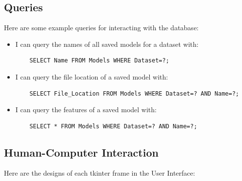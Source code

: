 \documentclass[./project-report/src/latex/project-report.tex]{subfiles}
\begin{document}
\subsection{Queries}

Here are some example queries for interacting with the database:

\begin{itemize}
    \item I can query the names of all saved models for a dataset with:
    \begin{verbatim}
    SELECT Name FROM Models WHERE Dataset=?;
    \end{verbatim}
    \item I can query the file location of a saved model with:
    \begin{verbatim}
    SELECT File_Location FROM Models WHERE Dataset=? AND Name=?;
    \end{verbatim}
    \item I can query the features of a saved model with:
    \begin{verbatim}
    SELECT * FROM Models WHERE Dataset=? AND Name=?;
    \end{verbatim}
\end{itemize}

\subsection{Human-Computer Interaction}

Here are the designs of each tkinter frame in the User Interface:
\end{document}
